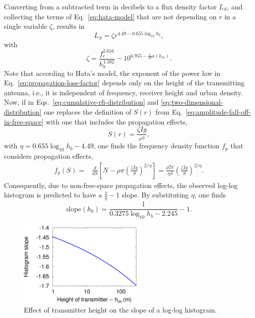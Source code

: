 \documentclass[useAMS,usenatbib]{mn2e}
\begin{document}
Converting from a subtracted term in decibels to a flux density factor $L_S$, and collecting the terms of Eq.~\eqref{eq:hata-model} that are not depending on $r$ in a single variable $\zeta$, results in
\begin{equation} \label{eq:propagation-loss-factor}
 L_S = \zeta r^{4.49 - 0.655 \log_{10} h_b},
\end{equation}
with
\begin{equation} \label{eq:zeta-definition}
 \zeta = \frac{f_c^{2.616}}{h_b^{1.382}} - 10^{6.955-\frac{1}{10} a(h_m)}.
\end{equation}
Note that according to Hata's model, the exponent of the power law in Eq.~\eqref{eq:propagation-loss-factor} depends only on the height of the transmitting antenna, i.e., it is independent of frequency, receiver height and urban density. Now, if in Eqs.~\eqref{eq:cumulative-rfi-distribution} and \eqref{eq:two-dimensional-distribution} one replaces the definition of $S(r)$ from Eq.~\eqref{eq:amplitude-fall-off-in-free-space} with one that includes the propagation effects,
\begin{equation}
 S(r) = \frac{\zeta Ig}{r^\eta},
\end{equation}
with $\eta = 0.655 \log_{10} h_b - 4.49$, one finds the frequency density function $f_p$ that considers propagation effects,
\begin{align} \label{eq:frequency-density-with-propagation}
f_p(S)
= & \frac{d}{dS} \left[ N - \rho \pi \left( \frac{\zeta Ig }{S} \right)^{2/\eta} \right]
= \frac{\rho 2\pi}{\eta S} \left( \frac{\zeta Ig}{S} \right)^{2/\eta}.
\end{align}
Consequently, due to non-free-space propagation effects, the observed log-log histogram is predicted to have a $\frac{2}{\eta}-1$ slope. By substituting $\eta$, one finds
\begin{equation}
\textrm{slope}(h_b) = \frac{1}{0.3275 \log_{10} h_b - 2.245} - 1.
\end{equation}
\begin{figure}
\begin{center}\hspace{-1cm}\includegraphics[width=6cm]{img/transmitter-height/plot-transmitter-height-trimmed}
\caption{Effect of transmitter height on the slope of a log-log histogram.}
\label{fig:plot-transmitter-height}
\end{center}
\end{figure}
\end{document}
